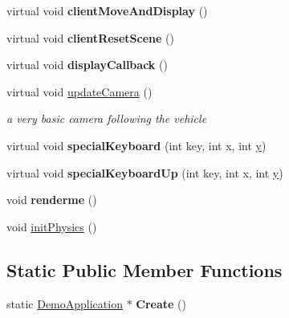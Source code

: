 \begin{DoxyCompactItemize}
\item 
\hypertarget{class_vehicle_demo_a1357d72e89a03d00465df4a7ced61197}{virtual void {\bfseries client\+Move\+And\+Display} ()}\label{class_vehicle_demo_a1357d72e89a03d00465df4a7ced61197}

\item 
\hypertarget{class_vehicle_demo_a10a5b51413cb87e18970fa09a5e5d168}{virtual void {\bfseries client\+Reset\+Scene} ()}\label{class_vehicle_demo_a10a5b51413cb87e18970fa09a5e5d168}

\item 
\hypertarget{class_vehicle_demo_afb904d5fd93f2357db48dacb64b42efb}{virtual void {\bfseries display\+Callback} ()}\label{class_vehicle_demo_afb904d5fd93f2357db48dacb64b42efb}

\item 
\hypertarget{class_vehicle_demo_a926811fed804ec20285405c8961467d8}{virtual void \hyperlink{class_vehicle_demo_a926811fed804ec20285405c8961467d8}{update\+Camera} ()}\label{class_vehicle_demo_a926811fed804ec20285405c8961467d8}

\begin{DoxyCompactList}\small\item\em a very basic camera following the vehicle \end{DoxyCompactList}\item 
\hypertarget{class_vehicle_demo_a09fb54ea69724bcfd13445a3a5cbafd4}{virtual void {\bfseries special\+Keyboard} (int key, int x, int \hyperlink{_ice_utils_8h_aa7ffaed69623192258fb8679569ff9ba}{y})}\label{class_vehicle_demo_a09fb54ea69724bcfd13445a3a5cbafd4}

\item 
\hypertarget{class_vehicle_demo_ae323c677d7b30a681cd5793da0af88cd}{virtual void {\bfseries special\+Keyboard\+Up} (int key, int x, int \hyperlink{_ice_utils_8h_aa7ffaed69623192258fb8679569ff9ba}{y})}\label{class_vehicle_demo_ae323c677d7b30a681cd5793da0af88cd}

\item 
\hypertarget{class_vehicle_demo_a4af5d2cb646957ac76da16eda8af5807}{void {\bfseries renderme} ()}\label{class_vehicle_demo_a4af5d2cb646957ac76da16eda8af5807}

\item 
void \hyperlink{class_vehicle_demo_afc9064529d77cf9003cc27e3d8b1dba3}{init\+Physics} ()
\end{DoxyCompactItemize}
\subsection*{Static Public Member Functions}
\begin{DoxyCompactItemize}
\item 
\hypertarget{class_vehicle_demo_a5cb5ba912c3c6ecdbf62c39fe29f6292}{static \hyperlink{class_demo_application}{Demo\+Application} $\ast$ {\bfseries Create} ()}\label{class_vehicle_demo_a5cb5ba912c3c6ecdbf62c39fe29f6292}

\end{DoxyCompactItemize}
